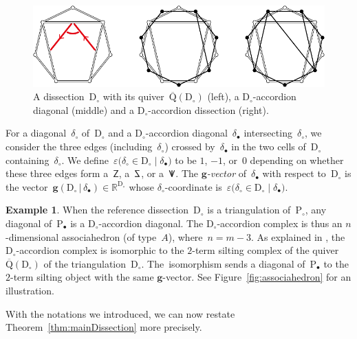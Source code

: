 \documentclass{amsart}
\theoremstyle{definition}
\newtheorem{example}[theorem]{Example}
\newcommand{\R}{\mathbb{R}} %
\renewcommand{\b}[1]{\mathbf{#1}} %
\newcommand{\fref}[1]{Figure~\ref{#1}} %
\newcommand{\darkblue}{\color{darkblue}} %
\newcommand{\defn}[1]{\textsl{\darkblue #1}} %
\newcommand{\polygon}{\mathrm{P}} %
\newcommand{\dissection}{\mathrm{D}} %
\newcommand{\sign}[3]{\varepsilon \big( {#1} \in {#2}\;|\;{#3} \big)} %
\newcommand{\SSS}{\reflectbox{$\mathsf{Z}$}} %
\newcommand{\ZZZ}{\mathsf{Z}} %
\newcommand{\VVV}{{\mathsf{{V \hspace{-.1686cm} I\,}}}} %
\newcommand{\gvector}[2]{\mathbf{g}(#1 \,|\, #2)} %
\newcommand{\quiver}{\mathrm{Q}} %
\begin{document}
\begin{figure}
	\capstart
	\centerline{\includegraphics[width=.9\textwidth]{exmAccordionDissections}}
	\caption{A dissection~$\dissection_\circ$ with its quiver~$\overline{\quiver}(\dissection_\circ)$ (left), a $\dissection_\circ$-accordion diagonal (middle) and a $\dissection_\circ$-accordion dissection (right).}
	\label{fig:exmAccordionDissections}
\end{figure}

For a diagonal~$\delta_\circ$ of~$\dissection_\circ$ and a $\dissection_\circ$-accordion diagonal~$\delta_\bullet$ intersecting~$\delta_\circ$, we consider the three edges (including~$\delta_\circ$) crossed by~$\delta_\bullet$ in the two cells of~$\dissection_\circ$ containing~$\delta_\circ$. We define~$\sign{\delta_\circ}{\dissection_\circ}{\delta_\bullet}$ to be $1$, $-1$, or~$0$ depending on whether these three edges form a~$\ZZZ$, a~$\SSS$, or a~$\VVV$.
The \defn{$\b{g}$-vector} of~$\delta_\bullet$ with respect to~$\dissection_\circ$ is the vector~$\gvector{\dissection_\circ}{\delta_\bullet} \in \R^{\dissection_\circ}$ whose $\delta_\circ$-coordinate is~$\sign{\delta_\circ}{\dissection_\circ}{\delta_\bullet}$.

\begin{example}
\label{exm:associahedron}
When the reference dissection~$\dissection_\circ$ is a triangulation of~$\polygon_\circ$, any diagonal of~$\polygon_\bullet$ is a $\dissection_\circ$-accordion diagonal.
The $\dissection_\circ$-accordion complex is thus an $n$-dimensional associahedron (of type~$A$), where~$n = m-3$.
As explained in \cite{CalderoChapotonSchiffler}, the $\dissection_\circ$-accordion complex is isomorphic to the $2$-term silting complex of the quiver~$\overline{\quiver}(\dissection_\circ)$ of the triangulation~$\dissection_\circ$.
The~isomorphism sends a diagonal of~$\polygon_\bullet$ to the $2$-term silting object with the same $\b{g}$-vector.
See \fref{fig:associahedron} for an illustration.
\end{example}

With the notations we introduced, we can now restate Theorem~\ref{thm:mainDissection} more precisely.
\end{document}
